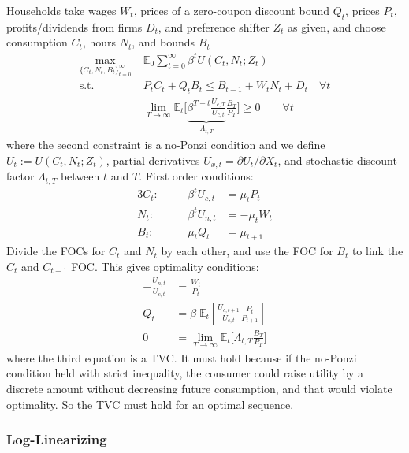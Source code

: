 \documentclass[12pt]{article}
\theoremstyle{plain}
\theoremstyle{definition}
\theoremstyle{remark}
\newcommand{\limT}{\lim_{T\rightarrow\infty}}
\newcommand{\E}{\mathbb{E}}
\newcommand{\sumtinfz}{\sum^\infty_{t=0}}
\newcommand{\tinfz}{^\infty_{t=0}}
\begin{document}
Households take wages $W_t$, prices of a zero-coupon discount bound
$Q_t$, prices $P_t$, profits/dividends from firms $D_t$, and preference
shifter $Z_t$ as given, and choose consumption $C_t$, hours $N_t$, and
bounds $B_t$
\begin{align*}
  \max_{\{C_t,N_t,B_t\}\tinfz} \;
  &\E_0\sumtinfz \beta^t U(C_t,N_t;Z_t) \\
  \text{s.t.}\quad&
  P_tC_t + Q_{t}B_t \leq B_{t-1} + W_tN_t + D_t\quad \forall t\\
  &\limT \E_t\bigg[
    \underbrace{\beta^{T-t} \frac{U_{c,T}}{U_{c,t}}}_{\Lambda_{t,T}}
    \frac{B_T}{P_T}
  \bigg]
  \geq 0
  \qquad \forall t
\end{align*}
where the second constraint is a no-Ponzi condition and
we define $U_t:=U(C_t,N_t;Z_t)$, partial derivatives
$U_{x,t}=\partial U_t/\partial X_t$, and stochastic discount factor
$\Lambda_{t,T}$ between $t$ and $T$.
First order conditions:
\begin{alignat*}{3}
  C_t:&&\quad
  \beta^t U_{c,t} &= \mu_t P_t
  \\
  N_t:&&\quad
  \beta^t U_{n,t} &= -\mu_t W_t
  \\
  B_t:&&\quad
  \mu_t Q_t &= \mu_{t+1}
\end{alignat*}
Divide the FOCs for $C_t$ and $N_t$ by each other, and use the FOC for
$B_t$ to link the $C_t$ and $C_{t+1}$ FOC. This gives optimality
conditions:
\begin{align*}
  -\frac{U_{n,t}}{U_{c,t}}
  &=
  \frac{W_t}{P_{t}} \\
  Q_t &=
  \beta\;
  \E_t\left[
    \frac{U_{c,t+1}}{U_{c,t}}
    \frac{P_t}{P_{t+1}}
  \right]
  \\
  0 &=
  \limT \E_t\bigg[
    \Lambda_{t,T}
    \frac{B_T}{P_T}
  \bigg]
\end{align*}
where the third equation is a TVC. It must hold because if the no-Ponzi
condition held with strict inequality, the consumer could raise
utility by a discrete amount without decreasing future consumption, and
that would violate optimality. So the TVC must hold for an optimal
sequence.

\clearpage
\subsubsection{Log-Linearizing}
\end{document}
